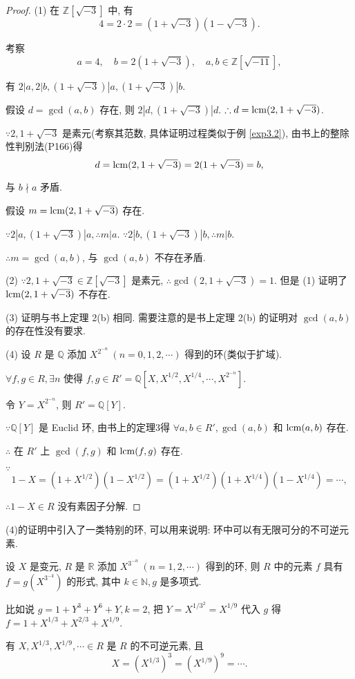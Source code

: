 \documentclass[color=black,device=normal,lang=cn,mode=geye]{elegantnote}
\begin{document}
\begin{proof}
    (1) 在 $\mathbb{Z}[\sqrt{-3}]$ 中, 有
    \[4=2\cdot2=(1+\sqrt{-3})(1-\sqrt{-3}).\]

    考察
    \[a=4,\quad b=2(1+\sqrt{-3}),\quad a,b\in\mathbb{Z}[\sqrt{-11}],\]

    有 $2|a,2|b,(1+\sqrt{-3})|a,(1+\sqrt{-3})|b$.

    假设 $d=\gcd(a,b)$ 存在, 则 $2|d,(1+\sqrt{-3})|d$. $\therefore d=\operatorname{lcm} (2,1+\sqrt{-3})$.

    $\because 2,1+\sqrt{-3}$ 是素元(考察其范数, 具体证明过程类似于例 \ref{exp3.2}), 由书上的整除性判别法(P166)得
    \[d=\operatorname{lcm} (2,1+\sqrt{-3})=2(1+\sqrt{-3})=b,\]

    与 $b\nmid a$ 矛盾.

    假设 $m=\operatorname{lcm} (2,1+\sqrt{-3})$ 存在.

    $\because 2|a,(1+\sqrt{-3})|a,\therefore m|a$. $\because 2|b,(1+\sqrt{-3})|b,\therefore m|b$.

    $\therefore m=\gcd(a,b)$, 与 $\gcd(a,b)$ 不存在矛盾.

    (2) $\because 2,1+\sqrt{-3}\in\mathbb{Z}[\sqrt{-3}]$ 是素元, $\therefore\gcd(2,1+\sqrt{-3})=1$. 但是 (1) 证明了 $\operatorname{lcm} (2,1+\sqrt{-3})$ 不存在.

    (3) 证明与书上定理 2(b) 相同. 需要注意的是书上定理 2(b) 的证明对 $\gcd(a,b)$ 的存在性没有要求.

    (4) 设 $R$ 是 $\mathbb{Q}$ 添加 $X^{2^{-n}}\ (n=0,1,2,\cdots)$ 得到的环(类似于扩域).

    $\forall f,g\in R,\exists n$ 使得 $f,g\in R'=\mathbb{Q}[X,X^{1/2},X^{1/4},\cdots,X^{2^{-n}}]$.

    令 $Y=X^{2^{-n}}$, 则 $R'=\mathbb{Q}[Y]$.

    $\because\mathbb{Q}[Y]$ 是 Euclid 环, 由书上的定理3得 $\forall a,b\in R',\gcd(a,b)$ 和 $\operatorname{lcm} (a,b)$ 存在.

    $\therefore$ 在 $R'$ 上 $\gcd(f,g)$ 和 $\operatorname{lcm} (f,g)$ 存在.


    $\because$
    \[1-X=(1+X^{1/2})(1-X^{1/2})=(1+X^{1/2})(1+X^{1/4})(1-X^{1/4})=\cdots,\]

    $\therefore 1-X\in R$ 没有素因子分解.
\end{proof}
\begin{note}
    (4)的证明中引入了一类特别的环, 可以用来说明: 环中可以有无限可分的不可逆元素.
\end{note}
\begin{example}
    设 $X$ 是变元, $R$ 是 $\mathbb{R}$ 添加 $X^{3^{-n}}\ (n=1,2,\cdots)$ 得到的环, 则 $R$ 中的元素 $f$ 具有 $f=g(X^{3^{-k}})$ 的形式, 其中 $k\in\mathbb{N},g$ 是多项式.

    比如说 $g=1+Y^3+Y^6+Y,k=2$, 把 $Y=X^{1/3^2}=X^{1/9}$ 代入 $g$ 得 $f=1+X^{1/3}+X^{2/3}+X^{1/9}$.

    有 $X,X^{1/3},X^{1/9},\cdots\in R$ 是 $R$ 的不可逆元素, 且
    \[X=(X^{1/3})^3=(X^{1/9})^9=\cdots.\]
\end{example}
\end{document}
